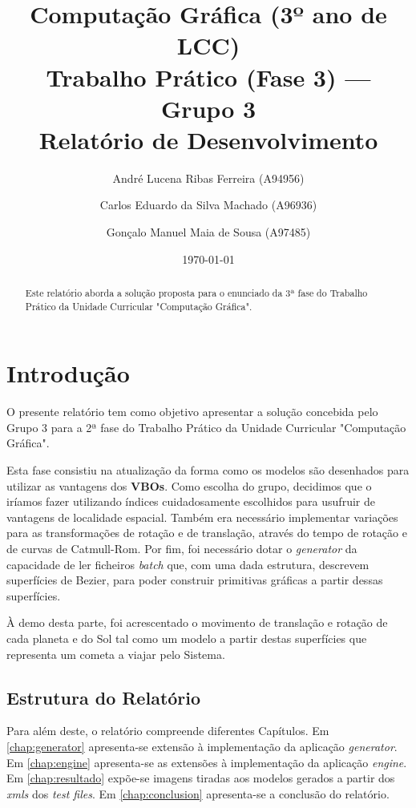 \documentclass[14pt, a4 paper]{report}
\title{Computação Gráfica (3º ano de LCC)\\
       \textbf{Trabalho Prático (Fase 3) — Grupo 3}\\ Relatório de Desenvolvimento}
\author{André Lucena Ribas Ferreira (A94956) 
    \and Carlos Eduardo da Silva Machado (A96936)
    \and Gonçalo Manuel Maia de Sousa (A97485)}
\date{\today} %
\begin{document}
\maketitle

\begin{abstract}
    Este relatório aborda a solução proposta para o enunciado da 3ª fase do Trabalho Prático da Unidade Curricular "Computação Gráfica". 
\end{abstract}

\tableofcontents

\chapter{Introdução} \label{chap:intro}

O presente relatório tem como objetivo apresentar a solução concebida pelo Grupo 3 para a 2ª fase do Trabalho Prático da Unidade Curricular "Computação Gráfica". 

Esta fase consistiu na atualização da forma como os modelos são desenhados para utilizar as vantagens dos \textbf{VBOs}. Como escolha do grupo, decidimos que o iríamos fazer utilizando índices cuidadosamente escolhidos para usufruir de vantagens de localidade espacial. Também era necessário implementar variações para as transformações de rotação e de translação, através do tempo de rotação e de curvas de Catmull-Rom. Por fim, foi necessário dotar o \textit{generator} da capacidade de ler ficheiros \textit{batch} que, com uma dada estrutura, descrevem superfícies de Bezier, para poder construir primitivas gráficas a partir dessas superfícies. 

À demo desta parte, foi acrescentado o movimento de translação e rotação de cada planeta e do Sol tal como um modelo a partir destas superfícies que representa um cometa a viajar pelo Sistema.

\section{Estrutura do Relatório}

Para além deste, o relatório compreende diferentes Capítulos. Em \ref{chap:generator} apresenta-se extensão à implementação da aplicação \textit{generator}. Em \ref{chap:engine} apresenta-se as extensões à implementação da aplicação \textit{engine}. Em \ref{chap:resultado} expõe-se imagens tiradas aos modelos gerados a partir dos \textit{xmls} dos \textit{test files}.
Em \ref{chap:conclusion} apresenta-se a conclusão do relatório.
\end{document}
